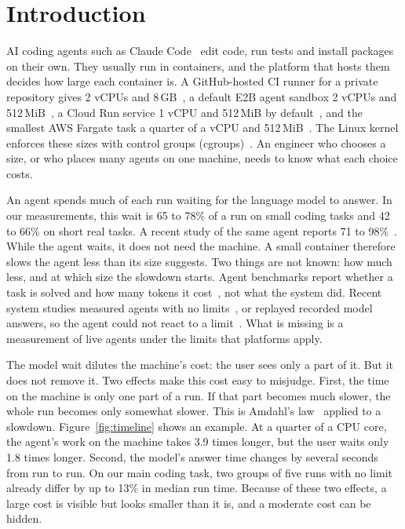 \documentclass[sigconf,review,anonymous]{acmart}
\begin{document}

\maketitle

\section{Introduction}

AI coding agents such as Claude Code~\cite{claudecode} edit code, run
tests and install packages on their own. They usually run in containers,
and the platform that hosts them decides how large each container is. A
GitHub-hosted CI runner for a private repository gives 2 vCPUs and
8\,GB~\cite{ghrunners}, a default E2B agent sandbox 2 vCPUs and
512\,MiB~\cite{e2bsandbox}, a Cloud Run service 1 vCPU and 512\,MiB by
default~\cite{cloudrun,cloudruncpu}, and the smallest AWS Fargate task a
quarter of a vCPU and 512\,MiB~\cite{fargate}. The Linux kernel enforces
these sizes with control groups (cgroups)~\cite{cgroupv2}. An engineer
who chooses a size, or who places many agents on one machine, needs to
know what each choice costs.

An agent spends much of each run waiting for the language model to
answer. In our measurements, this wait is 65 to 78\% of a run on small
coding tasks and 42 to 66\% on short real tasks. A recent study of the
same agent reports 71 to 98\%~\cite{yuan2026}. While the agent waits, it
does not need the machine. A small container therefore slows the agent
less than its size suggests. Two things are not known: how much less,
and at which size the slowdown starts. Agent benchmarks report whether a
task is solved and how many tokens it
cost~\cite{jimenez2024,yang2024}, not what the system did. Recent system
studies measured agents with no limits~\cite{agentcgroup}, or replayed
recorded model answers, so the agent could not react to a
limit~\cite{choi2026}. What is missing is
a measurement of live agents under the limits that platforms apply.

The model wait dilutes the machine's cost: the user sees only a part of
it. But it does not remove it. Two effects make this cost easy to
misjudge. First, the time on the machine is only one part of a run. If
that part becomes much slower, the whole run becomes only somewhat
slower. This is Amdahl's law~\cite{amdahl1967} applied to a slowdown.
Figure~\ref{fig:timeline} shows an example. At a quarter of a CPU core,
the agent's work on the machine takes 3.9 times longer, but the user
waits only 1.8 times longer. Second, the model's answer time changes by several seconds from run to
run. On our main coding task, two groups of five runs with no limit
already differ by up to 13\% in median run time. Because of these two
effects, a large cost is visible but looks smaller than it is, and a
moderate cost can be hidden.
\end{document}
